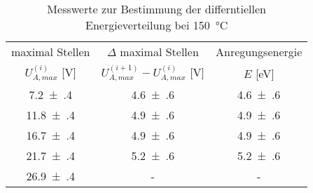 \begin{table}[!h]
	\centering
	\begin{tabular}{|c|c|c|}
		\hline
		maximal Stellen & $\Delta$ maximal Stellen & Anregungsenergie\\
		$U_{A,max}^{(i)}$ [\si{\volt}] & $U_{A,max}^{(i+1)} - U_{A,max}^{(i)}$ [\si{\volt}] & $E$ [\si{\eV}]\\
\hline\hline
		\num{7.2(4)} & \num{4.6(6)} & \num{4.6(6)}\\
		\num{11.8(4)} & \num{4.9(6)} & \num{4.9(6)}\\
		\num{16.7(4)} & \num{4.9(6)} & \num{4.9(6)}\\
		\num{21.7(4)} & \num{5.2(6)} & \num{5.2(6)}\\
		\num{26.9(4)} & - & -\\
		\hline
	\end{tabular}
	\caption{Messwerte zur Bestimmung der differntiellen Energieverteilung bei \SI{150}{\degreeCelsius} \label{tab:Auswertung_Diff_Energie_Verteilung_150C}}
\end{table}
